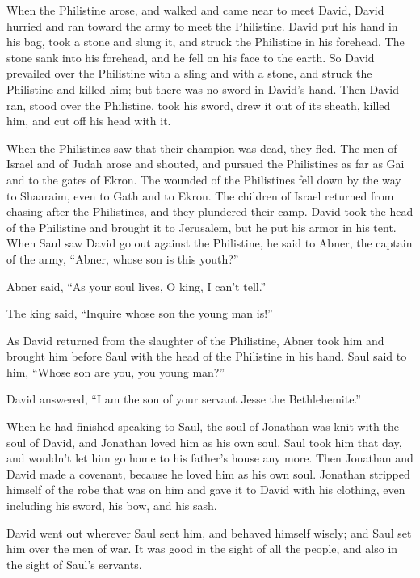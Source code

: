 \myverse{}When the Philistine arose, and walked and came near to meet
David, David hurried and ran toward the army to meet the Philistine.
\myverse{}David put his hand in his bag, took a stone and slung it, and struck the
Philistine in his forehead. The stone sank into his forehead, and he fell on his face to the earth.
\myverse{}So David prevailed over the Philistine with a sling and with a stone, and
struck the Philistine and killed him; but there was no sword in David’s hand.
\myverse{}Then David ran, stood over the Philistine, took his sword, drew it out of
its sheath, killed him, and cut off his head with it.

When the Philistines saw that their champion was dead, they fled.
\myverse{}The men of Israel and of Judah arose and shouted, and pursued the Philistines
as far as Gai and to the gates of Ekron. The wounded of the Philistines fell down by the way to Shaaraim,
even to Gath and to Ekron.
\myverse{}The children of Israel returned from chasing after the Philistines, and they
plundered their camp.
\myverse{}David took the head of the Philistine and brought it to Jerusalem, but he
put his armor in his tent.
\myverse{}When Saul saw David go out against the Philistine, he said to Abner, the
captain of the army, “Abner, whose son is this youth?”

Abner said, “As your soul lives, O king, I can’t tell.”

\myverse{}The king said, “Inquire whose son the young man is!”

\myverse{}As David returned from the slaughter of the Philistine, Abner
took him and brought him before Saul with the head of the Philistine in his hand.
\myverse{}Saul said to him, “Whose son are you, you young man?”

David answered, “I am the son of your servant Jesse the Bethlehemite.”


\mychapter{} \myverse*{}When he had finished speaking to Saul, the soul of Jonathan was
knit with the soul of David, and Jonathan loved him as his own soul.
\myverse{}Saul took him that day, and wouldn’t let him go home to his father’s house
any more.
\myverse{}Then Jonathan and David made a covenant, because he loved him as his own soul.
\myverse{}Jonathan stripped himself of the robe that was on him and gave it to David
with his clothing, even including his sword, his bow, and his sash.

\myverse{}David went out wherever Saul sent him, and behaved himself wisely;
and Saul set him over the men of war. It was good in the sight of all the people, and also in the sight
of Saul’s servants.

